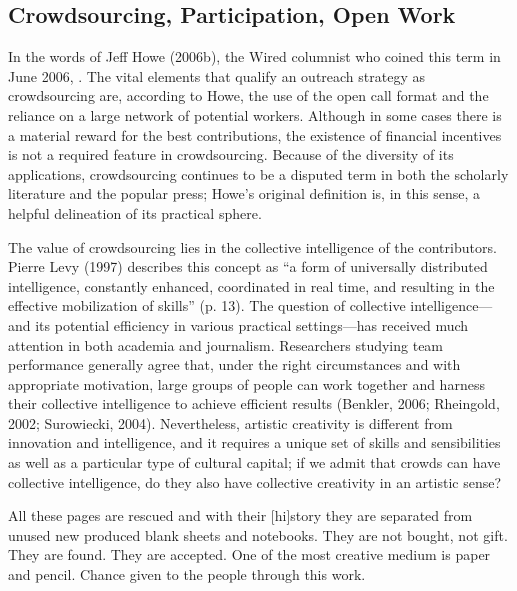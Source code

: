\subsection{Crowdsourcing, Participation, Open Work}
In the words of Jeff Howe (2006b), the Wired columnist who coined this term in June 2006, . The vital elements that qualify an outreach strategy as crowdsourcing are, according to Howe, the use of the open call format and the reliance on a large network of potential workers. Although in some cases there is a material reward for the best contributions, the existence of financial incentives is not a required feature in crowdsourcing. Because of the diversity of its applications, crowdsourcing continues to be a disputed term in both the scholarly literature and the popular press; Howe’s original definition is, in this sense, a helpful delineation of its practical sphere.

The value of crowdsourcing lies in the collective intelligence of the contributors. Pierre Levy (1997) describes this concept as “a form of universally distributed intelligence, constantly enhanced, coordinated in real time, and resulting in the effective mobilization of skills” (p. 13). The question of collective intelligence—and its potential efficiency in various practical settings—has received much attention in both academia and journalism. Researchers studying team performance generally agree that, under the right circumstances and with appropriate motivation, large groups of people can work together and harness their collective intelligence to achieve efficient results (Benkler, 2006; Rheingold, 2002; Surowiecki, 2004). Nevertheless, artistic creativity is different from innovation and intelligence, and it requires a unique set of skills and sensibilities as well as a particular type of cultural capital; if we admit that crowds can have collective intelligence, do they also have collective creativity in an artistic sense?

All these pages are rescued and with their [hi]story they are separated from unused new produced blank sheets and notebooks. They are not bought, not gift. They are found. They are accepted. One of the most creative medium is paper and pencil. Chance given to the people through this work.

